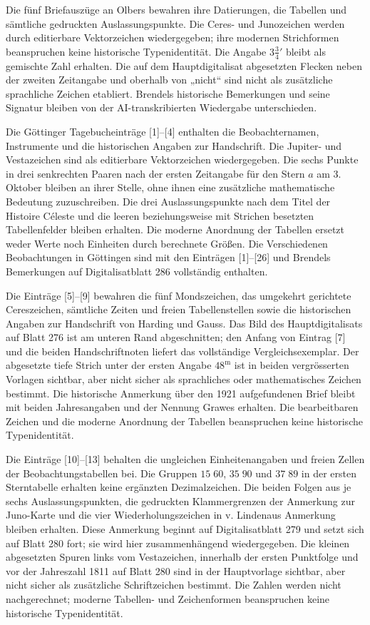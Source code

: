 Die fünf Briefauszüge an Olbers bewahren ihre Datierungen, die Tabellen und sämtliche gedruckten Auslassungspunkte. Die Ceres- und Junozeichen werden durch editierbare Vektorzeichen wiedergegeben; ihre modernen Strichformen beanspruchen keine historische Typenidentität. Die Angabe $3\tfrac34{}'$ bleibt als gemischte Zahl erhalten. Die auf dem Hauptdigitalisat abgesetzten Flecken neben der zweiten Zeitangabe und oberhalb von „nicht“ sind nicht als zusätzliche sprachliche Zeichen etabliert. Brendels historische Bemerkungen und seine Signatur bleiben von der AI-transkribierten Wiedergabe unterschieden.

Die Göttinger Tagebucheinträge [1]–[4] enthalten die Beobachternamen, Instrumente und die historischen Angaben zur Handschrift. Die Jupiter- und Vestazeichen sind als editierbare Vektorzeichen wiedergegeben. Die sechs Punkte in drei senkrechten Paaren nach der ersten Zeitangabe für den Stern $a$ am 3. Oktober bleiben an ihrer Stelle, ohne ihnen eine zusätzliche mathematische Bedeutung zuzuschreiben. Die drei Auslassungspunkte nach dem Titel der Histoire Céleste und die leeren beziehungsweise mit Strichen besetzten Tabellenfelder bleiben erhalten. Die moderne Anordnung der Tabellen ersetzt weder Werte noch Einheiten durch berechnete Größen. Die Verschiedenen Beobachtungen in Göttingen sind mit den Einträgen [1]–[26] und Brendels Bemerkungen auf Digitalisatblatt 286 vollständig enthalten.

Die Einträge [5]–[9] bewahren die fünf Mondszeichen, das umgekehrt gerichtete Cereszeichen, sämtliche Zeiten und freien Tabellenstellen sowie die historischen Angaben zur Handschrift von Harding und Gauss. Das Bild des Hauptdigitalisats auf Blatt 276 ist am unteren Rand abgeschnitten; den Anfang von Eintrag [7] und die beiden Handschriftnoten liefert das vollständige Vergleichsexemplar. Der abgesetzte tiefe Strich unter der ersten Angabe $48^{\mathrm m}$ ist in beiden vergrösserten Vorlagen sichtbar, aber nicht sicher als sprachliches oder mathematisches Zeichen bestimmt. Die historische Anmerkung über den 1921 aufgefundenen Brief bleibt mit beiden Jahresangaben und der Nennung Grawes erhalten. Die bearbeitbaren Zeichen und die moderne Anordnung der Tabellen beanspruchen keine historische Typenidentität.

Die Einträge [10]–[13] behalten die ungleichen Einheitenangaben und freien Zellen der Beobachtungstabellen bei. Die Gruppen $15\;60$, $35\;90$ und $37\;89$ in der ersten Sterntabelle erhalten keine ergänzten Dezimalzeichen. Die beiden Folgen aus je sechs Auslassungspunkten, die gedruckten Klammergrenzen der Anmerkung zur Juno-Karte und die vier Wiederholungszeichen in v. Lindenaus Anmerkung bleiben erhalten. Diese Anmerkung beginnt auf Digitalisatblatt 279 und setzt sich auf Blatt 280 fort; sie wird hier zusammenhängend wiedergegeben. Die kleinen abgesetzten Spuren links vom Vestazeichen, innerhalb der ersten Punktfolge und vor der Jahreszahl 1811 auf Blatt 280 sind in der Hauptvorlage sichtbar, aber nicht sicher als zusätzliche Schriftzeichen bestimmt. Die Zahlen werden nicht nachgerechnet; moderne Tabellen- und Zeichenformen beanspruchen keine historische Typenidentität.

